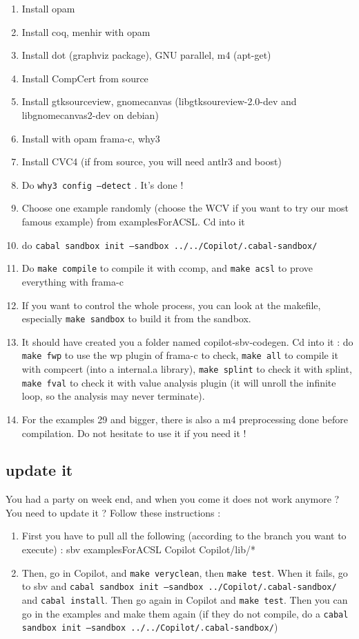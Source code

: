 \documentclass[11pt]{article}
\begin{document}
\begin{enumerate}
	\item Install opam
	\item Install coq, menhir with opam
	\item Install dot (graphviz package), GNU parallel, m4 (apt-get)
	\item Install CompCert from source
	\item Install gtksourceview, gnomecanvas (libgtksoureview-2.0-dev and libgnomecanvas2-dev on debian)
	\item Install with opam frama-c, why3
	\item Install CVC4 (if from source, you will need antlr3 and boost)
	\item Do \texttt{why3 config --detect} . It's done !
	\item Choose one example randomly (choose the WCV if you want to try our most famous example) from examplesForACSL. Cd into it
	\item do \texttt{cabal sandbox init --sandbox ../../Copilot/.cabal-sandbox/}
	\item Do \texttt{make compile} to compile it with ccomp, and \texttt{make acsl} to prove everything with frama-c 
	\item If you want to control the whole process, you can look at the makefile, especially \texttt{make sandbox} to build it from the sandbox.
	\item It should have created you a folder named copilot-sbv-codegen. Cd into it :
	\subitem do \texttt{make fwp} to use the wp plugin of frama-c to check, \texttt{make all} to compile it with compcert (into a internal.a library), \texttt{make splint} to check it with splint, \texttt{make fval} to check it with value analysis plugin (it will unroll the infinite loop, so the analysis may never terminate).
	\item For the examples 29 and bigger, there is also a m4 preprocessing done before compilation. Do not hesitate to use it if you need it !
\end{enumerate}

\subsection{update it}

You had a party on week end, and when you come it does not work anymore ? You need to update it ? Follow these instructions :

\begin{enumerate}
\item First you have to pull all the following (according to the branch you want to execute) :
\subitem sbv
\subitem examplesForACSL
\subitem Copilot
\subitem Copilot/lib/*
\item Then, go in Copilot, and \texttt{make veryclean}, then \texttt{make test}. When it fails, go to sbv and \texttt{cabal sandbox init --sandbox ../Copilot/.cabal-sandbox/} and \texttt{cabal install}. Then go again in Copilot and \texttt{make test}. Then you can go in the examples and make them again (if they do not compile, do a \texttt{cabal sandbox init --sandbox ../../Copilot/.cabal-sandbox/})
\end{enumerate}
\end{document}
